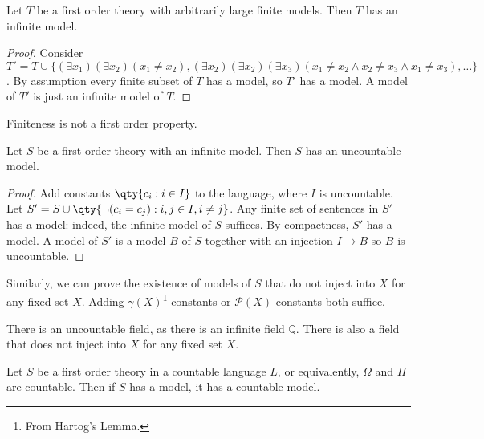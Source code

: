 \begin{corollary}
    Let $T$ be a first order theory with arbitrarily large finite models.
    Then $T$ has an infinite model.
\end{corollary}

\begin{proof}
    Consider $T' = T \cup \{(\exists x_1)(\exists x_2)(x_1 \neq x_2),(\exists x_2)(\exists x_2)(\exists x_3)(x_1 \neq x_2 \wedge x_2 \neq x_3 \wedge x_1 \neq x_3), \dots\}$.
    By assumption every finite subset of $T$ has a model, so $T'$ has a model.
    A model of $T'$ is just an infinite model of $T$.
\end{proof}

Finiteness is not a first order property.

\begin{theorem}
    Let $S$ be a first order theory with an infinite model.
    Then $S$ has an uncountable model.
\end{theorem}

\begin{proof}
    Add constants $\qty{c_i : i \in I}$ to the language, where $I$ is uncountable.
    Let $S' = S \cup \qty{\neg (c_i = c_j) : i, j \in I, i \neq j}$.
    Any finite set of sentences in $S'$ has a model: indeed, the infinite model of $S$ suffices.
    By compactness, $S'$ has a model.
    A model of $S'$ is a model $B$ of $S$ together with an injection $I \to B$ so $B$ is uncountable.
\end{proof}

\begin{remark}
    Similarly, we can prove the existence of models of $S$ that do not inject into $X$ for any fixed set $X$.
    Adding $\gamma(X)$\footnote{From Hartog's Lemma.} constants or $\mathcal P(X)$ constants both suffice.
\end{remark}

\begin{example}
    There is an uncountable field, as there is an infinite field $\mathbb Q$.
    There is also a field that does not inject into $X$ for any fixed set $X$.
\end{example}

\begin{theorem}
    Let $S$ be a first order theory in a countable language $L$, or equivalently, $\Omega$ and $\Pi$ are countable.
    Then if $S$ has a model, it has a countable model.
\end{theorem}

